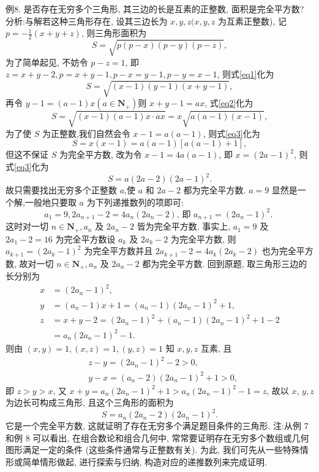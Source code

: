 例8. 是否存在无穷多个三角形, 其三边的长是互素的正整数, 面积是完全平方数?
分析:与解若这种三角形存在, 设其三边长为 $x, y, z(x, y, z$ 为互素正整数), 记 $p=-\frac{1}{2}(x+y+z)$, 则三角形面积为
$$
S=\sqrt{p(p-x)(p-y)(p-z)}, \label{eq1}
$$
为了简单起见, 不妨令 $p-z=1$, 即 $z=x+y-2, p=x+y-1, p-x= y-1, p-y=x-1$, 则式\ref{eq1}化为
$$
S=\sqrt{(x-1)(y-1)(x+y-1)}, \label{eq2}
$$
再令 $y-1=(a-1) x\left(a \in \mathbf{N}_{+}\right)$则 $x+y-1=a x$, 式\ref{eq2}化为
$$
S=\sqrt{(x-1)(a-1) x \cdot a x}=x \sqrt{a(a-1)(x-1)}, \label{eq3}
$$
为了使 $S$ 为正整数,我们自然会令 $x-1=a(a-1)$, 则式\ref{eq3}化为
$$
S=x(x-1)=a(a-1)[a(a-1)+1],
$$
但这不保证 $S$ 为完全平方数, 改为令 $x-1=4 a(a-1)$, 即 $x=(2 a-1)^2$, 则 式\ref{eq3}化为
$$
S=a(2 a-2)(2 a-1)^2 .
$$
故只需要找出无穷多个正整数 $a$,使 $a$ 和 $2 a-2$ 都为完全平方数.
$a=9$ 显然是一个解,一般地只要取 $a$ 为下列递推数列的项即可:
$$
a_1=9,2 a_{n+1}-2=4 a_n\left(2 a_n-2\right) \text {, 即 } a_{n+1}=\left(2 a_n-1\right)^2 \text {. }
$$
这时对一切 $n \in \mathbf{N}_{+}, a_n$ 及 $2 a_n-2$ 皆为完全平方数.
事实上, $a_1=9$ 及 $2 a_1-2=16$ 为完全平方数设 $a_k$ 及 $2 a_k-2$ 为完全平方数, 则 $a_{k+1}=\left(2 a_k-1\right)^2$ 为完全平方数并且 $2 a_{k+1}-2=4 a_k\left(2 a_k-2\right)$ 也为完全平方数, 故对一切 $n \in \mathbf{N}_{+}, a_n$ 及 $2 a_n-2$ 都为完全平方数.
回到原题, 取三角形三边的长分别为
$$
\begin{aligned}
x & =\left(2 a_n-1\right)^2, \\
y & =\left(a_n-1\right) x+1=\left(a_n-1\right)\left(2 a_n-1\right)^2+1, \\
z & =x+y-2=\left(2 a_n-1\right)^2+\left(a_n-1\right)\left(2 a_n-1\right)^2+1-2 \\
& =a_n\left(2 a_n-1\right)^2-1 .
\end{aligned}
$$
则由 $(x, y)=1,(x, z)=1,(y, z)=1$ 知 $x, y, z$ 互素, 且
$$
\begin{aligned}
& z-y=\left(2 a_n-1\right)^2-2>0, \\
& y-x=\left(a_n-2\right)\left(2 a_n-1\right)^2+1>0,
\end{aligned}
$$
即 $z>y>x$, 又 $x+y=a_n\left(2 a_n-1\right)^2+1>a_n\left(2 a_n-1\right)^2-1=z$, 故以 $x$, $y, z$ 为边长可构成三角形, 且这个三角形的面积为
$$
S=a_n\left(2 a_n-2\right)\left(2 a_n-1\right)^2 .
$$
它是一个完全平方数, 这就证明了存在无穷多个满足题目条件的三角形.
注:从例 7 和例 8 可以看出, 在组合数论和组合几何中, 常常要证明存在无穷多个数组或几何图形满足一定的条件 (这些条件通常与正整数有关). 为此, 我们可先从一些特殊情形或简单情形做起, 进行探索与归纳, 构造对应的递推数列来完成证明.


